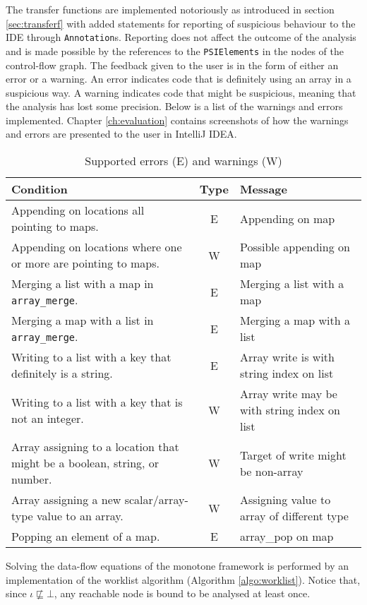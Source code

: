 The transfer functions are implemented notoriously as introduced in section \ref{sec:transferf} with added statements for reporting of suspicious behaviour to the IDE through \texttt{Annotation}s. Reporting does not affect the outcome of the analysis and is made possible by the references to the \texttt{PSIElements} in the nodes of the control-flow graph. The feedback given to the user is in the form of either an error or a warning. An error indicates code that is definitely using an array in a suspicious way. A warning indicates code that might be suspicious, meaning that the analysis has lost some precision. Below is a list of the warnings and errors implemented. Chapter \ref{ch:evaluation} contains screenshots of how the warnings and errors are presented to the user in IntelliJ IDEA.
{\def\arraystretch{1.5}
\begin{table}[h]
\centering
\begin{tabularx}{\textwidth}{XcX}
Condition                                                                 & Type    & Message\\\hline
Appending on locations all pointing to maps.                              & E   & Appending on map                             \\
Appending on locations where one or more are pointing to maps.            & W & Possible appending on map                    \\
Merging a list with a map in \texttt{array\_merge}.                       & E   & Merging a list with a map                    \\
Merging a map with a list in \texttt{array\_merge}.                       & E   & Merging a map with a list                    \\
Writing to a list with a key that definitely is a string.                 & E   & Array write is with string index on list     \\
Writing to a list with a key that is not an integer.                      & W & Array write may be with string index on list \\
Array assigning to a location that might be a boolean, string, or number. & W & Target of write might be non-array           \\
Array assigning a new scalar/array-type value to an array.                & W & Assigning value to array of different type   \\
Popping an element of a map.                                                  & E   & array\_pop on map  
\end{tabularx}
\caption{Supported errors (E) and warnings (W)}
\label{my-label}
\end{table}}
Solving the data-flow equations of the monotone framework is performed by an implementation of the worklist algorithm (Algorithm \ref{algo:worklist}). Notice that, since $\iota \not\sqsubseteq \bot$, any reachable node is bound to be analysed at least once. 

